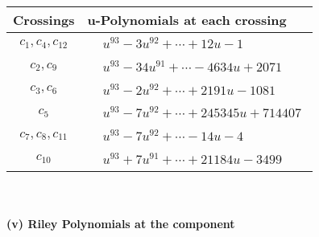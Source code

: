 \documentclass[1p]{elsarticle_modified}
\theoremstyle{definition}
\begin{document}
\begin{tabular}{m{50pt}|m{274pt}}
Crossings & \hspace{64pt}u-Polynomials at each crossing \\
\hline $$\begin{aligned}c_{1},c_{4},c_{12}\end{aligned}$$&$\begin{aligned}
&u^{93}-3 u^{92}+\cdots+12 u-1
\end{aligned}$\\
\hline $$\begin{aligned}c_{2},c_{9}\end{aligned}$$&$\begin{aligned}
&u^{93}-34 u^{91}+\cdots-4634 u+2071
\end{aligned}$\\
\hline $$\begin{aligned}c_{3},c_{6}\end{aligned}$$&$\begin{aligned}
&u^{93}-2 u^{92}+\cdots+2191 u-1081
\end{aligned}$\\
\hline $$\begin{aligned}c_{5}\end{aligned}$$&$\begin{aligned}
&u^{93}-7 u^{92}+\cdots+245345 u+714407
\end{aligned}$\\
\hline $$\begin{aligned}c_{7},c_{8},c_{11}\end{aligned}$$&$\begin{aligned}
&u^{93}-7 u^{92}+\cdots-14 u-4
\end{aligned}$\\
\hline $$\begin{aligned}c_{10}\end{aligned}$$&$\begin{aligned}
&u^{93}+7 u^{91}+\cdots+21184 u-3499
\end{aligned}$\\
\hline
\end{tabular}\\~\\
\newpage\renewcommand{\arraystretch}{1}
\flushleft \textbf{(v) Riley Polynomials at the component}\newline \\
\end{document}
